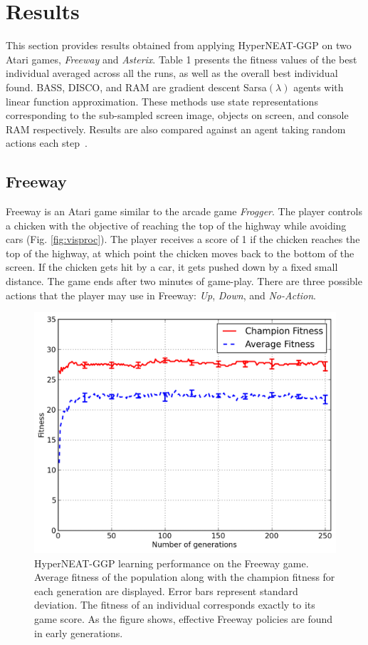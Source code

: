 \documentclass{sig-alternate}
\begin{document}
\section{Results}
\label{sec:results}
This section provides results obtained from applying HyperNEAT-GGP on two Atari games, \textit{Freeway} and \textit{Asterix}. Table 1 presents the fitness values of the best individual averaged across all the runs, as well as the overall best individual found. BASS, DISCO, and RAM are gradient descent Sarsa$(\lambda)$ agents with linear function approximation. These methods use state representations corresponding to the sub-sampled screen image, objects on screen, and console RAM respectively. Results are also compared against an agent taking random actions each step~\cite{naddaf10}. 

\subsection {Freeway}

Freeway is an Atari game similar to the arcade game \textit{Frogger}. The player controls a chicken with the objective of reaching the top of the highway while avoiding cars (Fig. \ref{fig:visproc}). The player receives a score of 1 if the chicken reaches the top of the highway, at which point the chicken moves back to the bottom of the screen. If the chicken gets hit by a car, it gets pushed down by a fixed small distance. The game ends after two minutes of game-play. There are three possible actions that the player may use in Freeway: \textit{Up}, \textit{Down}, and \textit{No-Action}.

\begin{figure}[ht]
\begin{center}
\includegraphics[width=\columnwidth]{figures/freeway-results}
\end{center}
\caption{HyperNEAT-GGP learning performance on the Freeway game. Average fitness of the population along with the champion fitness for each generation are displayed. Error bars represent standard deviation. The fitness of an individual corresponds exactly to its game score. As the figure shows, effective Freeway policies are found in early generations.}
\label{fig:freeway-curve}
\end{figure}
\end{document}
